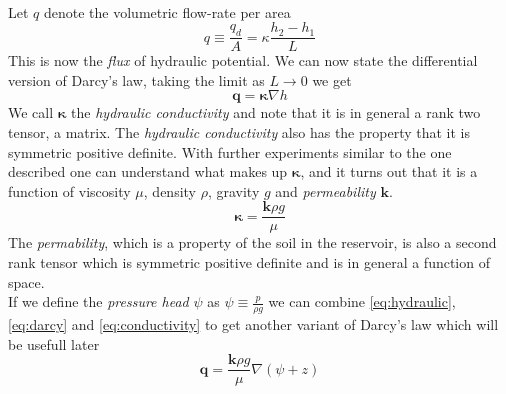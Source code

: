 \documentclass[../Main/main.tex]{subfiles}
\begin{document}
\\
Let $q$ denote the volumetric flow-rate per area
\begin{equation*}
q \equiv \frac{q_d}{A} = \kappa \frac{h_2-h_1}{L}
\end{equation*}
This is now the \emph{flux} of hydraulic potential. We can now state the differential version of Darcy's law, taking the limit as $L\rightarrow 0$ we get 
\begin{equation}\label{eq:darcy}
\pmb{q} = \pmb{\kappa} \nabla h
\end{equation}
We call $\pmb{\kappa}$ the \emph{hydraulic conductivity} and note that it is in general a rank two tensor, a matrix. The \emph{hydraulic conductivity} also has the property that it is symmetric positive definite. 
With further experiments similar to the one described one can understand what makes up $\pmb{\kappa}$, and it turns out that it is  a function of viscosity $\mu$, density $\rho$, gravity $g$ and \emph{permeability} $\pmb{k}$.
\begin{equation} \label{eq:conductivity}
\pmb{\kappa} = \frac{\pmb{k} \rho g}{\mu}
\end{equation}
The \emph{permability}, which is a property of the soil in the reservoir, is also a second rank tensor which is symmetric positive definite and is in general a function of space. \\
If we define the \emph{pressure head} $\psi$ as $\psi \equiv \frac{p}{\rho g}$ we can combine \eqref{eq:hydraulic}, \eqref{eq:darcy} and \eqref{eq:conductivity} to get another variant of Darcy's law which will be usefull later
\begin{equation}\label{eq:darcyv2}
\pmb{q} = \frac{\pmb{k}\rho g}{\mu}\nabla(\psi + z)
\end{equation}
\end{document}
